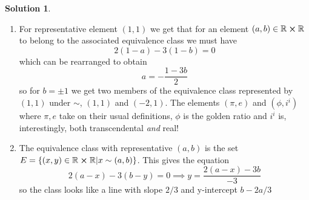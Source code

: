 \documentclass[10pt]{article}
\theoremstyle{definition}
\newtheorem{soln}{Solution}
\begin{document}
\begin{soln}
\begin{enumerate}[label=(\alph*)]
\begin{enumerate}[label=(\roman*)]
\begin{proof}
\begin{align*}
                               & (a,b)\sim(c,d)    \\
                      \implies & 2(a-c)-3(b-d) = 0 \\
                    \end{align*}
                    and
                    \begin{align*}
                               & (c,d)\sim(e,f)    \\
                      \implies & 2(c-e)-3(d-f) = 0 \\
                    \end{align*}
                    so
                    \begin{align*}
                               & 2(a-c)-3(c-d) + 2(c-e)-3(d-f)  = 0 \\
                      \implies & 2(a-c + c-e)-3(b-d + d-f)  = 0     \\
                      \implies & 2(a-e)-3(b-f)  = 0                 \\
                      \implies & (a,b)\sim(e,f) \qedhere            \\
                    \end{align*}
                  \end{proof}
          \end{enumerate}
          Therefore $\sim$ is an equivalence relation on $\mathbb{R}\cross\mathbb{R}$.
    \item For representative element $(1,1)$ we get that for an element $(a,b)\in \mathbb{R}\cross\mathbb{R}$
          to belong to the associated equivalence class we must have
          $$2(1-a)-3(1-b)=0$$
          which can be rearranged to obtain
          $$a=-\frac{1-3b}{2}$$
          so for $b=\pm 1$ we get two members of the equivalence class represented by $(1,1)$ under $\sim$, $(1,1)$ and $(-2,1)$.
          The elements $(\pi, e)$ and $(\phi, i^i)$ where $\pi,e$ take on their usual definitions, $\phi$ is the golden ratio and $i^i$ is, interestingly,
          both transcendental \emph{and} real!
    \item The equivalence class with representative $(a,b)$ is the set $E=\left\{(x,y)\in \mathbb{R}\cross\mathbb{R} | x\sim (a,b)\right\}$. This gives the equation
          $$2(a-x)-3(b-y)=0\implies y=\frac{2(a-x)-3b}{-3}$$
          so the class looks like a line with slope $2/3$ and y-intercept $b-2a/3$
  \end{enumerate}
\end{soln}
\newpage
\end{document}
